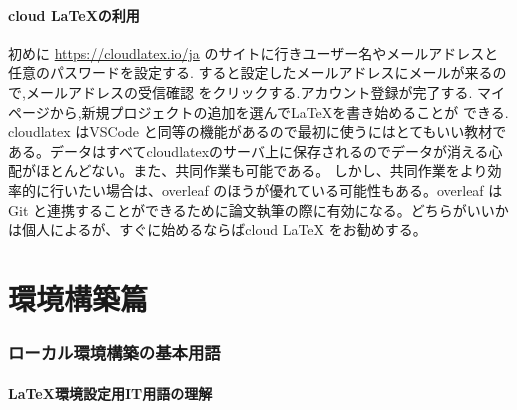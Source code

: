 \documentclass{ltjsarticle}
\begin{document}
\subsection{cloud \LaTeX の利用}
初めに
\url{https://cloudlatex.io/ja}
のサイトに行きユーザー名やメールアドレスと任意のパスワードを設定する.
すると設定したメールアドレスにメールが来るので,メールアドレスの受信確認
をクリックする.アカウント登録が完了する.
マイページから,新規プロジェクトの追加を選んで\LaTeX を書き始めることが
できる.
cloudlatex はVSCode と同等の機能があるので最初に使うにはとてもいい教材である。データはすべてcloudlatexのサーバ上に保存されるのでデータが消える心配がほとんどない。また、共同作業も可能である。
しかし、共同作業をより効率的に行いたい場合は、overleaf のほうが優れている可能性もある。overleaf はGit と連携することができるために論文執筆の際に有効になる。どちらがいいかは個人によるが、すぐに始めるならばcloud LaTeX をお勧めする。
\part{環境構築篇}
\section{ローカル環境構築の基本用語}
\subsection{\LaTeX 環境設定用IT用語の理解}
\end{document}
